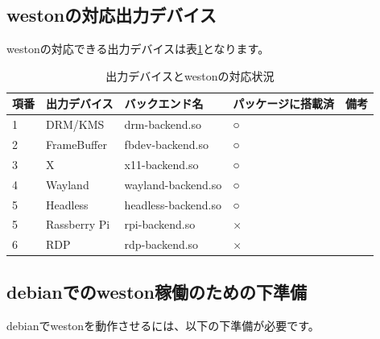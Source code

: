 \documentclass[mingoth,a4paper]{jsarticle}
\begin{document}
\subsection{westonの対応出力デバイス}

 westonの対応できる出力デバイスは表\ref{tab:debian-weston-backends}となります。

\begin{table}[ht]
\begin{center}
\begin{tabular}{|l|p{4cm}|p{4cm}|p{3cm}|l|}
\hline
項番&出力デバイス&バックエンド名&パッケージに搭載済&備考\\
\hline \hline
1& DRM/KMS & drm-backend.so & ○ & \\
2& FrameBuffer & fbdev-backend.so & ○ & \\
3& X & x11-backend.so & ○ & \\
4& Wayland & wayland-backend.so & ○ & \\
5& Headless & headless-backend.so & ○ & \\
5& Rassberry Pi & rpi-backend.so & × & \\
6& RDP & rdp-backend.so & × & \\
\hline
\end{tabular}
\label{tab:debian-weston-backends}
\caption{出力デバイスとwestonの対応状況}
\end{center}
\end{table}

\subsection{debianでのweston稼働のための下準備}
\label{sec:pre-requisite}
debianでwestonを動作させるには、以下の下準備が必要です。
\end{document}
